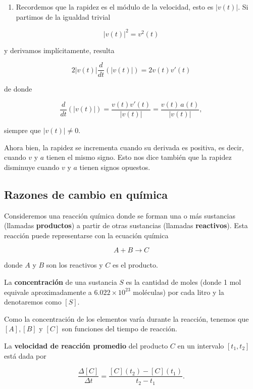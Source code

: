 \documentclass[
  letterpaper,
]{book}
\providecommand{\tightlist}{%
  \setlength{\itemsep}{0pt}\setlength{\parskip}{0pt}}
\theoremstyle{plain}
\theoremstyle{remark}
\begin{document}
\begin{tcolorbox}
\begin{enumerate}
\def\labelenumi{\arabic{enumi}.}
\setcounter{enumi}{8}
\tightlist
\item
  Recordemos que la rapidez es el módulo de la velocidad, esto es
  \(|v(t)|\). Si partimos de la igualdad trivial
\end{enumerate}

\[
|v(t)|^2=v^2(t)
\]

y derivamos implícitamente, resulta

\[
2|v(t)|\frac{d}{dt}\left(|v(t)|\right)=2v(t)v'(t)
\]

de donde

\[
\frac{d}{dt}\left(|v(t)|\right) = \frac{v(t)v'(t)}{|v(t)|}=\frac{v(t)\,a(t)}{|v(t)|},
\]

siempre que \(|v(t)|\neq 0\).

Ahora bien, la rapidez se incrementa cuando su derivada es positiva, es
decir, cuando \(v\) y \(a\) tienen el mismo signo. Esto nos dice también
que la rapidez disminuye cuando \(v\) y \(a\) tienen signos opuestos.

\end{tcolorbox}

\subsection{Razones de cambio en
química}\label{razones-de-cambio-en-quuxedmica}

Consideremos una reacción química donde se forman una o más sustancias
(llamadas \textbf{productos}) a partir de otras sustancias (llamadas
\textbf{reactivos}). Esta reacción puede representarse con la ecuación
química

\[
A+B \rightarrow C
\]

donde \(A\) y \(B\) son los reactivos y \(C\) es el producto.

La \textbf{concentración} de una sustancia \(S\) es la cantidad de moles
(donde 1 mol equivale aproximadamente a \(6\text{.}022\times 10^{23}\)
moléculas) por cada litro y la denotaremos como \([S]\).

Como la concentración de los elementos varía durante la reacción,
tenemos que \([A], [B]\) y \([C]\) son funciones del tiempo de reacción.

La \textbf{velocidad de reacción promedio} del producto \(C\) en un
intervalo \([t_1,t_2]\) está dada por

\[
\frac{\Delta[C]}{\Delta t}=\frac{[C](t_2)-[C](t_1)}{t_2-t_1}.
\]
\end{document}
